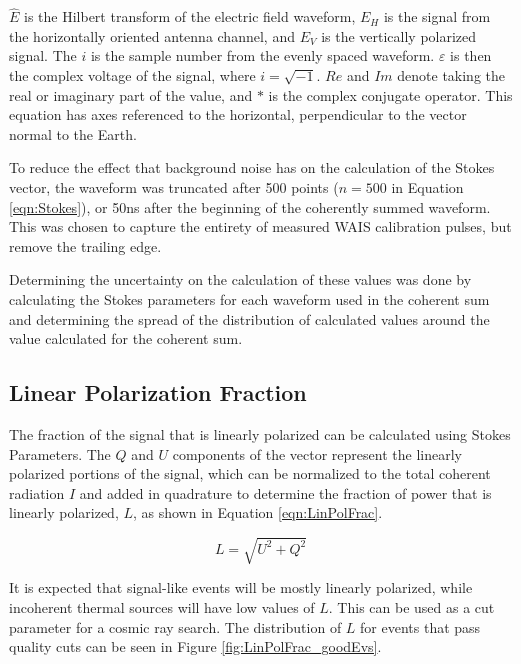 		
	 $\hat{E}$ is the Hilbert transform of the electric field waveform, $E_{H}$ is the signal from the horizontally oriented antenna channel, and $E_{V}$ is the vertically polarized signal.  The $i$ is the sample number from the evenly spaced waveform.  $\varepsilon$ is then the complex voltage of the signal, where $i=\sqrt{-1}$.  $Re$ and $Im$ denote taking the real or imaginary part of the value, and $*$ is the complex conjugate operator.  This equation has axes referenced to the horizontal, perpendicular to the vector normal to the Earth. \cite{PhysRevD.94.103010}
	 
	 To reduce the effect that background noise has on the calculation of the Stokes vector, the waveform was truncated after 500 points ($n=500$ in Equation \ref{eqn:Stokes}), or 50ns after the beginning of the coherently summed waveform.  This was chosen to capture the entirety of measured WAIS calibration pulses, but remove the trailing edge.
	 
	 Determining the uncertainty on the calculation of these values was done by calculating the Stokes parameters for each waveform used in the coherent sum and determining the spread of the distribution of calculated values around the value calculated for the coherent sum.
	 
	\subsection{Linear Polarization Fraction}
		The fraction of the signal that is linearly polarized can be calculated using Stokes Parameters.  The $Q$ and $U$ components of the vector represent the linearly polarized portions of the signal, which can be normalized to the total coherent radiation $I$ and added in quadrature to determine the fraction of power that is linearly polarized, $L$, as shown in Equation \ref{eqn:LinPolFrac}.
		
	\begin{equation}
		L=\sqrt{U^2 + Q^2}
	\label{eqn:LinPolFrac}
	\end{equation}
		
	It is expected that signal-like events will be mostly linearly polarized, while incoherent thermal sources will have low values of $L$.  This can be used as a cut parameter for a cosmic ray search.  The distribution of $L$ for events that pass quality cuts can be seen in Figure \ref{fig:LinPolFrac_goodEvs}.
	

